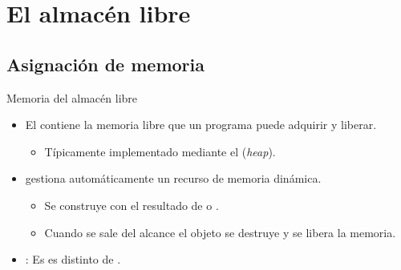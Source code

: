 \section{El almacén libre}

\subsection{Asignación de memoria}

\begin{frame}[t]{Memoria del almacén libre}
\begin{itemize}
  \item El  contiene la memoria libre que un programa
        puede adquirir y liberar.
    \begin{itemize}
      \item Típicamente implementado mediante el  (\emph{heap}).
    \end{itemize}

  \item {} gestiona automáticamente un recurso de memoria
        dinámica.
    \begin{itemize}
      \item Se construye con el resultado de  o .
      \item Cuando se sale del alcance el objeto se destruye y se libera la memoria.
    \end{itemize}

  \item {}: Es es distinto de .
\end{itemize}
\end{frame}

